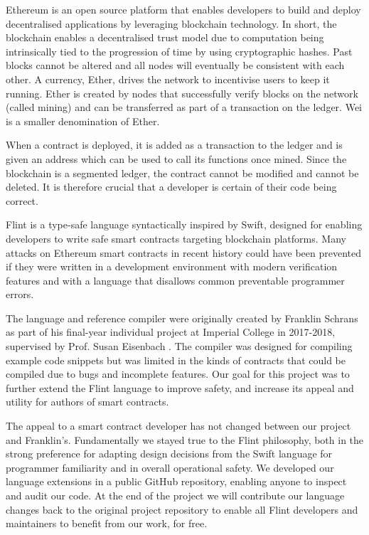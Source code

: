 Ethereum is an open source platform that enables developers to build and deploy decentralised applications by leveraging blockchain technology. In short, the blockchain enables a decentralised trust model due to computation being intrinsically tied to the progression of time by using cryptographic hashes. Past blocks cannot be altered and all nodes will eventually be consistent with each other. A currency, Ether, drives the network to incentivise users to keep it running. Ether is created by nodes that successfully verify blocks on the network (called mining) and can be transferred as part of a transaction on the ledger. Wei is a smaller denomination of Ether.

When a contract is deployed, it is added as a transaction to the ledger and is given an address which can be used to call its functions once mined. Since the blockchain is a segmented ledger, the contract cannot be modified and cannot be deleted. It is therefore crucial that a developer is certain of their code being correct.

Flint is a type-safe language syntactically inspired by Swift, designed for enabling developers to write safe smart contracts targeting blockchain platforms. Many attacks on Ethereum smart contracts in recent history could have been prevented if they were written in a development environment with modern verification features and with a language that disallows common preventable programmer errors.

The language and reference compiler were originally created by Franklin Schrans as part of his final-year individual project at Imperial College in 2017-2018, supervised by Prof. Susan Eisenbach \cite{flint}. The compiler was designed for compiling example code snippets but was limited in the kinds of contracts that could be compiled due to bugs and incomplete features. Our goal for this project was to further extend the Flint language to improve safety, and increase its appeal and utility for authors of smart contracts.

The appeal to a smart contract developer has not changed between our project and Franklin's. Fundamentally we stayed true to the Flint philosophy, both in the strong preference for adapting design decisions from the Swift language for programmer familiarity and in overall operational safety. We developed our language extensions in a public GitHub repository, enabling anyone to inspect and audit our code. At the end of the project we will contribute our language changes back to the original project repository to enable all Flint developers and maintainers to benefit from our work, for free.
